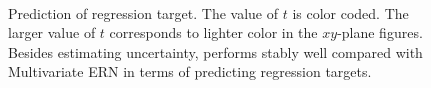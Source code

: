 \begin{figure}
    \centering
     \\
    \caption{Prediction of regression target. The value of $t$ is color coded. The larger value of $t$ corresponds to lighter color in the $xy$-plane figures. Besides estimating uncertainty, \ours performs stably well compared with Multivariate ERN in terms of predicting regression targets.}
    \label{fig:multivariate_appen}
\end{figure}




